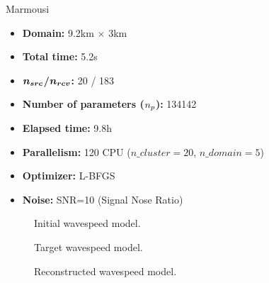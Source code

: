 
\begin{frame}[noframenumbering]{Marmousi}

  \vspace{-0.6cm}
   \begin{multicols}{2}

     \begin{itemize}
       \scriptsize
    \item \textbf{Domain:} 9.2km $\times$ 3km
    \item \textbf{Total time:} 5.2s
    \item \textbf{$\boldsymbol{{n_{src}}}$/$\boldsymbol{{n_{rcv}}}$:} 20 / 183
    \item \textbf{Number of parameters (${n_{p}}$):} 134142
    \item \textbf{Elapsed time:} 9.8h
    \item \textbf{Parallelism:} 120 CPU ($n\_cluster=20$, $n\_domain=5$)
    \item \textbf{Optimizer:} L-BFGS
    \item \textbf{Noise:} SNR=10 (Signal Nose Ratio)
    \end{itemize}

     \columnbreak
     \scriptsize
     \setlength{\modelwidth}{6.0cm}
     \begin{figure}
       \renewcommand{\modelfile}{image/mesh_adapt/wadg_adapt_vp_0}
       
       \vspace{-0.3cm}
       \caption*{\scriptsize{Initial wavespeed model.}}
       \label{marmousi_blind_c4}
     \end{figure}
     \vspace{-1.2cm}
     \begin{figure}
       \renewcommand{\modelfile}{image/marmousi}
       
       \vspace{-0.3cm}
       \caption*{\scriptsize{Target wavespeed model.}}
       \label{marmousi_blind_c4}
     \end{figure}
     \vspace{-1.2cm}
          \begin{figure}
       \renewcommand{\modelfile}{image/mesh_adapt/wadg_adapt_vp_100}
       
       \vspace{-0.3cm}
       \caption*{\scriptsize{Reconstructed wavespeed model.}}
       \label{marmousi_blind_c4}
     \end{figure}
   \end{multicols}


\end{frame}
